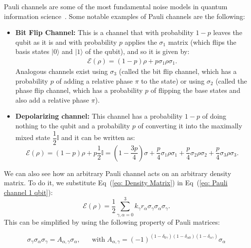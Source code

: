 \documentclass[10pt,letterpaper]{article} %
\newcommand{\eref}[1]{Eq~(\ref{#1})}
\begin{document}
Pauli channels are some of the 
most fundamental noise models in quantum information science~\cite{Terhal}. 
Some notable examples of Pauli channels are the following:
\begin{itemize}
\item \textbf{Bit Flip Channel:} This is a channel that with probability $1-p$ leaves the qubit as it is 
and with probability $p$ applies the $\sigma_1$ matrix 
(which flips the basis states $|0\rangle$ and $|1\rangle$ of the qubit), and
so it is given by:
\begin{align*}
\mathcal{E}(\rho) = (1-p) \rho + p \sigma_1 \rho \sigma_1.
\end{align*}
Analogous channels exist using $\sigma_3$ (called the bit flip channel,
which has a probability $p$ of adding a relative phase $\pi$ to the state) or 
using $\sigma_2$ (called the phase flip channel, 
which has a probability $p$ of 
flipping the base states and also add a relative phase $\pi$).
\item \textbf{Depolarizing channel:} 
This channel has a probability $1-p$
of doing nothing to the qubit and a probability $p$ of converting it into the maximally mixed state $\dfrac{1}{2} \mathbb{I}$
and it can be written as:
\begin{equation}
\mathcal{E}(\rho) = (1-p)\rho + p \dfrac{1}{2} \mathbb{I} = \left(1 - \dfrac{3p}{4} \right) \sigma + \dfrac{p}{4} \sigma_1 \rho \sigma_1 + \dfrac{p}{4} \sigma_2 \rho \sigma_2+ \dfrac{p}{4} \sigma_3 \rho \sigma_3.
\end{equation} 
\end{itemize}

We can also see how an arbitrary Pauli channel acts on an arbitrary  
density matrix.
To do it, we substitute \eref{eq: Density Matrix} 
in \eref{eq: Pauli channel 1 qbit}:
\begin{equation}
\mathcal{E}(\rho) = \dfrac{1}{2}\sum_{\gamma,\alpha=0}^3 k_{\gamma} r_{\alpha} \sigma_{\gamma} \sigma_{\alpha} \sigma_{\gamma}.
\end{equation}
This can be simplified by using the following property of Pauli matrices:


{\color{green}
\begin{equation*}
\sigma_{\gamma} \sigma_{\alpha} \sigma_{\gamma}  =   A_{\alpha,\gamma} \sigma_{\alpha}, \;\;\;\;\;\; \text{with} \; A_{\alpha, \gamma} = (-1)^{(1-\delta_{0\gamma}) (1-\delta_{\alpha 0}) (1-\delta_{\alpha \gamma })} \sigma_{\alpha}
\end{equation*}
}
\end{document}
